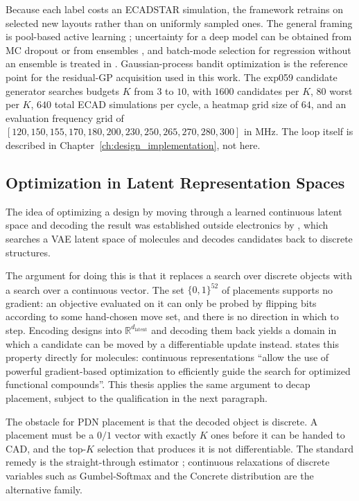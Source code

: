 Because each label costs an ECADSTAR simulation, the framework retrains on
selected new layouts rather than on uniformly sampled ones. The general framing
is pool-based active learning \cite{settles2009active}; uncertainty for a deep
model can be obtained from MC dropout \cite{gal2016dropout} or from ensembles
\cite{lakshminarayanan2016deep}, and batch-mode selection for regression without
an ensemble is treated in \cite{batchal2022batch}. Gaussian-process bandit
optimization \cite{srinivas2010gp} is the reference point for the residual-GP
acquisition used in this work. The exp059 candidate generator searches budgets
$K$ from $3$ to $10$, with $1600$ candidates per $K$, $80$ worst per $K$, $640$
total ECAD simulations per cycle, a heatmap grid size of $64$, and an evaluation
frequency grid of $[120, 150, 155, 170, 180, 200, 230, 250, 265, 270, 280, 300]$
in MHz. The loop itself is described in
Chapter~\ref{ch:design_implementation}, not here.

\subsection{Optimization in Latent Representation Spaces}
\label{subsec:latent_space_opt}

The idea of optimizing a design by moving through a learned continuous latent
space and decoding the result was established outside electronics by
\cite{gomezbombarelli2018automatic}, which searches a VAE latent space of
molecules and decodes candidates back to discrete structures.

The argument for doing this is that it replaces a search over discrete objects
with a search over a continuous vector. The set $\{0,1\}^{52}$ of placements
supports no gradient: an objective evaluated on it can only be probed by flipping
bits according to some hand-chosen move set, and there is no direction in which
to step. Encoding designs into $\mathbb{R}^{d_{\mathrm{latent}}}$ and decoding
them back yields a domain in which a candidate can be moved by a differentiable
update instead. \cite{gomezbombarelli2018automatic} states this property
directly for molecules: continuous representations ``allow the use of powerful
gradient-based optimization to efficiently guide the search for optimized
functional compounds''. This thesis applies the same argument to decap placement,
subject to the qualification in the next paragraph.

The obstacle for PDN placement is that the decoded object is discrete. A
placement must be a $0/1$ vector with exactly $K$ ones before it can be handed to
CAD, and the top-$K$ selection that produces it is not differentiable. The
standard remedy is the straight-through estimator \cite{bengio2013straight};
continuous relaxations of discrete variables such as Gumbel-Softmax
\cite{jang2016gumbel} and the Concrete distribution \cite{maddison2016concrete}
are the alternative family.

